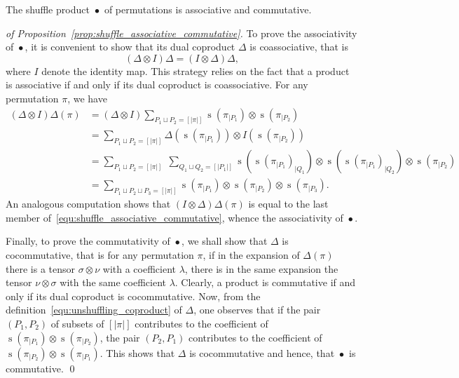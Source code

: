 \documentclass[a4paper]{llncs}
\DeclareMathOperator{\STD}{\mathrm{s}}
\DeclareMathOperator{\SHUFFLE}{\bullet}
\begin{document}
\begin{proposition} \label{prop:shuffle_associative_commutative}
    The shuffle product $\SHUFFLE$ of permutations is associative and
    commutative.
\end{proposition}
\begin{proof}[of Proposition~\ref{prop:shuffle_associative_commutative}]
    To prove the associativity of $\SHUFFLE$, it is convenient to show
    that its dual coproduct $\Delta$ is coassociative, that is
    \begin{equation}
        (\Delta \otimes I) \Delta = (I \otimes \Delta) \Delta,
    \end{equation}
    where $I$ denote the identity map. This strategy relies on the fact
    that a product is associative if and only if its dual coproduct is
    coassociative. For any permutation $\pi$, we have
    \begin{equation} \begin{split}
    \label{equ:shuffle_associative_commutative}
        (\Delta \otimes I) \Delta(\pi) & =
        (\Delta \otimes I)
        \sum_{P_1 \sqcup P_2 = [|\pi|]}
        \STD\left(\pi_{|P_1}\right) \otimes \STD\left(\pi_{|P_2}\right) \\
        & =
        \sum_{P_1 \sqcup P_2 = [|\pi|]}
        \Delta\left(\STD\left(\pi_{|P_1}\right)\right)
        \otimes I\left(\STD\left(\pi_{|P_2}\right)\right) \\
        & =
        \sum_{P_1 \sqcup P_2 = [|\pi|]} \;
        \sum_{Q_1 \sqcup Q_2 = [|P_1|]}
        \STD\left(\STD\left(\pi_{|P_1}\right)_{|Q_1}\right)
        \otimes
        \STD\left(\STD\left(\pi_{|P_1}\right)_{|Q_2}\right)
        \otimes \STD\left(\pi_{|P_2}\right) \\
        & =
        \sum_{P_1 \sqcup P_2 \sqcup P_3 = [|\pi|]}
        \STD\left(\pi_{|P_1}\right) \otimes
        \STD\left(\pi_{|P_2}\right) \otimes
        \STD\left(\pi_{|P_3}\right).
    \end{split} \end{equation}
    An analogous computation shows that $(I \otimes \Delta) \Delta(\pi)$
    is equal to the last member
    of~\eqref{equ:shuffle_associative_commutative}, whence the
    associativity of $\SHUFFLE$.
    \smallskip

    Finally, to prove the commutativity of $\SHUFFLE$, we shall show
    that $\Delta$ is cocommutative, that is for any permutation $\pi$,
    if in the expansion of $\Delta(\pi)$ there is a tensor
    $\sigma \otimes \nu$ with a coefficient $\lambda$, there is in the
    same expansion the tensor $\nu \otimes \sigma$ with the same
    coefficient $\lambda$. Clearly, a product is commutative if and only
    if its dual coproduct is cocommutative. Now, from the
    definition~\eqref{equ:unshuffling_coproduct} of $\Delta$, one
    observes that if the pair $(P_1, P_2)$ of subsets of $[|\pi|]$
    contributes to the coefficient of
    $\STD\left(\pi_{|P_1}\right) \otimes \STD\left(\pi_{|P_2}\right)$,
    the pair $(P_2, P_1)$ contributes to the coefficient of
    $\STD\left(\pi_{|P_2}\right) \otimes \STD\left(\pi_{|P_1}\right)$.
    This shows that $\Delta$ is cocommutative and hence, that $\SHUFFLE$
    is commutative.
    \qed
\end{proof}
\end{document}
